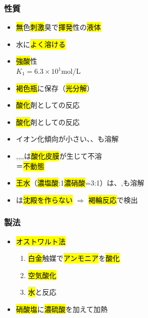 \subsubsection{性質}
\begin{itemize}
      \item \hl{無}色\hl{刺激}臭で\hl{揮発}性の\hl{液体}
      \item 水に\hl{よく溶ける}
      \item \hl{強酸}性\\
            \hl{} \hfill $K_{1}=6.3\times10^1$mol/L
      \item \hl{褐色瓶}に保存（\hl{光分解}）
      \item \hl{酸化}剤としての反応 \\
      \item \hl{酸化}剤としての反応 \\
      \item イオン化傾向が小さい、、も溶解
      \item \hl{},\hl{},\hl{},\hl{},\hl{}は\hl{酸化皮膜}が生じて不溶 \\
            ＝\hl{不動態}
      \item \hl{王水}（\hl{濃塩酸}:1\hl{濃硝酸}=3:1）は、,も溶解
      \item {}は\hl{沈殿を作らない} $\Rightarrow$ \hl{褐輪反応}で検出
\end{itemize}
\subsubsection{製法}
\begin{itemize}
      \item \hl{オストワルト法}\\
            \begin{enumerate}
                  \item \hl{白金}触媒で\hl{アンモニア}を\hl{酸化}\\
                  \item \hl{空気酸化}\\
                  \item \hl{水}と反応\\
            \end{enumerate}
      \item \hl{硝酸塩}に\hl{濃硫酸}を加えて加熱\\
\end{itemize}
